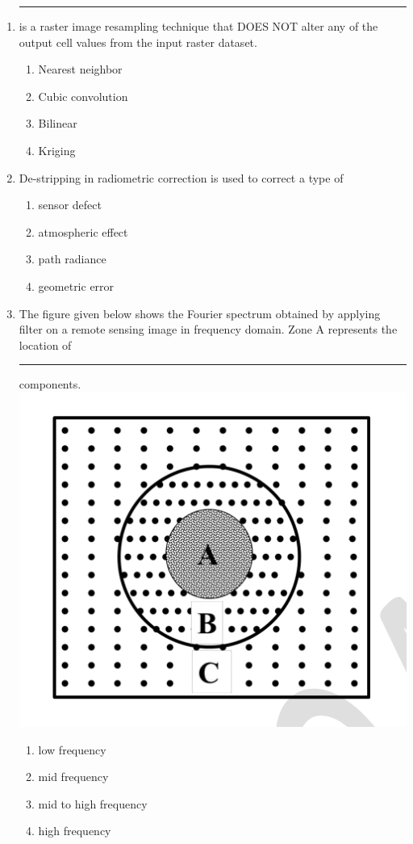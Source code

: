 \documentclass[12pt]{article}
\begin{document}
\begin{enumerate}
\item \rule{2cm}{0.15mm} is a raster image resampling technique that DOES NOT alter any of the
output cell values from the input raster dataset.  

\begin{enumerate}
 \item Nearest neighbor 
   \item Cubic convolution 
   \item Bilinear 
   \item Kriging
\end{enumerate}

\item De-stripping in radiometric correction is used to correct a type of 

\begin{enumerate}
    \item sensor defect 
   \item atmospheric effect 
   \item path radiance 
   \item geometric error
\end{enumerate}

\item The figure given below shows the Fourier spectrum obtained by applying filter on
a remote sensing image in frequency domain. Zone A represents the location of
\rule{2cm}{0.15mm} components. \\

      \includegraphics[scale = 1]{Figs/LatexImage9.png} \\
 \begin{enumerate}
    \item low frequency 
   \item mid frequency 
   \item mid to high frequency 
   \item high frequency
      \end{enumerate}


\end{enumerate}
\end{document}
